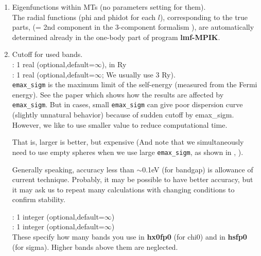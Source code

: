 \documentclass[a4paper,10pt,epsf,fleqn]{article}
\newcommand{\keyw}[1]{\fbox{\tt #1}}
\newcommand{\exe}[1]{{\bf #1}}
\begin{document}
{\begin{enumerate}
We expand eigenfunctions in the Muffin-tin division of the space.
See Eq.\cite{xxx} in Ref.\cite{xxx}; in
the current $GW$ implementation, we use very simple
form of eigenfuncitons (not by the 3-component formalism in the \cite{xxx}).

Thus the form of expansion is just related to the division of space;
not directly related to the difference among LAPW, LMTO, and PMT.


\item Eigenfunctions within MTs (no parameters setting for them).\\
The radial functions (phi and phidot for each $l$), 
corresponding to the true parts, 
(= 2nd component in the 3-component formalism \cite{xxx}),
are automatically determined already in the one-body part of program \exe{lmf-MPIK}.


\item
Cutoff for used bands.\\
\keyw{emax\_chi0}: 1 real (optional,default=$\infty$), in Ry\\

\keyw{emax\_sigm}: 1 real (optional,default=$\infty$; We usually use 3 Ry).\\
\verb+emax_sigm+ is the maximum limit of the self-energy 
(measured from the Fermi energy). See the paper \cite{xxx} which shows
how the results are affected by {\tt emax\_sigm}.
But in cases, small \verb+emax_sigm+ can give poor dispersion curve
(slightly unnatural behavior) because of sudden cutoff by emax\_sigm.
However, we like to use smaller value to reduce computational time.

That is, larger is better, but expensive (And note that 
we simultaneously need to use empty spheres when we use large
{\tt emax\_sigm}, as shown in \cite{xxx}, ). 

Generally speaking, accuracy less than $\sim $0.1eV (for bandgap) 
is allowance of current technique. Probably, it may be possible 
to have better accuracy, but it may ask us to repeat 
many calculations with changing conditions to confirm stability. 

\keyw{nband\_chi0}: 1 integer (optional,default=$\infty$)\\
\keyw{nband\_sigm}: 1 integer (optional,default=$\infty$)\\
These specify how many bands you use in {\bf hx0fp0} (for chi0) 
and in {\bf hsfp0} (for sigma). 
Higher bands above them are neglected.


\end{enumerate}}
\end{document}
